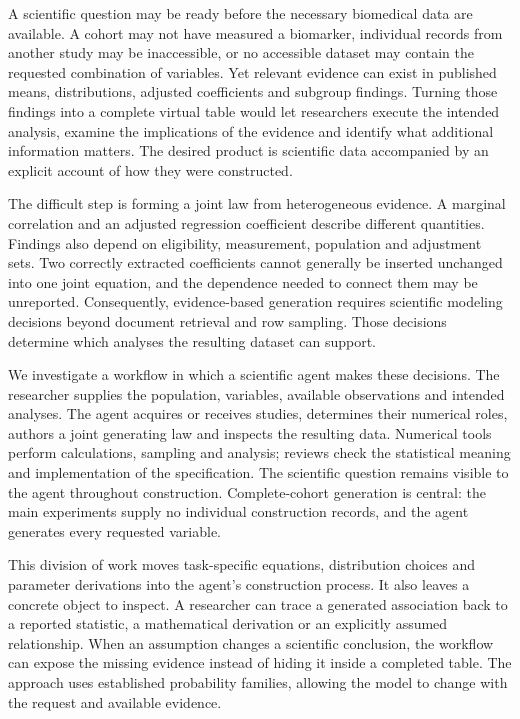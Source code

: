 \documentclass[sigconf,anonymous,review]{acmart}
\begin{document}
A scientific question may be ready before the necessary biomedical data are available. A cohort may not have measured a biomarker, individual records from another study may be inaccessible, or no accessible dataset may contain the requested combination of variables. Yet relevant evidence can exist in published means, distributions, adjusted coefficients and subgroup findings. Turning those findings into a complete virtual table would let researchers execute the intended analysis, examine the implications of the evidence and identify what additional information matters. The desired product is scientific data accompanied by an explicit account of how they were constructed.


The difficult step is forming a joint law from heterogeneous evidence. A marginal correlation and an adjusted regression coefficient describe different quantities. Findings also depend on eligibility, measurement, population and adjustment sets. Two correctly extracted coefficients cannot generally be inserted unchanged into one joint equation, and the dependence needed to connect them may be unreported. Consequently, evidence-based generation requires scientific modeling decisions beyond document retrieval and row sampling. Those decisions determine which analyses the resulting dataset can support.


We investigate a workflow in which a scientific agent makes these decisions. The researcher supplies the population, variables, available observations and intended analyses. The agent acquires or receives studies, determines their numerical roles, authors a joint generating law and inspects the resulting data. Numerical tools perform calculations, sampling and analysis; reviews check the statistical meaning and implementation of the specification. The scientific question remains visible to the agent throughout construction. Complete-cohort generation is central: the main experiments supply no individual construction records, and the agent generates every requested variable.


This division of work moves task-specific equations, distribution choices and parameter derivations into the agent's construction process. It also leaves a concrete object to inspect. A researcher can trace a generated association back to a reported statistic, a mathematical derivation or an explicitly assumed relationship. When an assumption changes a scientific conclusion, the workflow can expose the missing evidence instead of hiding it inside a completed table. The approach uses established probability families, allowing the model to change with the request and available evidence.
\end{document}
